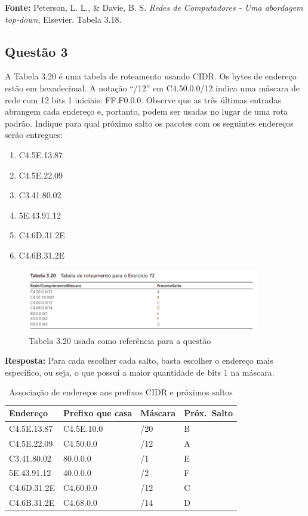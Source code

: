 \textbf{Fonte:} Peterson, L. L., \& Davie, B. S. \textit{Redes de Computadores - Uma abordagem top-down}, Elsevier. Tabela 3.18.

\subsection{Questão 3}
A Tabela 3.20 é uma tabela de roteamento usando CIDR. Os bytes de endereço estão em
hexadecimal. A notação “/12” em C4.50.0.0/12 indica uma máscara de rede com 12 bits 1 iniciais:
FF.F0.0.0. Observe que as três últimas entradas abrangem cada endereço e, portanto, podem ser usadas no lugar de uma rota padrão. 
Indique para qual próximo salto os pacotes com os seguintes endereços serão entregues:

\begin{enumerate}[label=\alph*.]
    \item C4.5E.13.87
    \item C4.5E.22.09
    \item C3.41.80.02
    \item 5E.43.91.12
    \item C4.6D.31.2E
    \item C4.6B.31.2E
\end{enumerate}

\begin{figure}[H]
    \centering
    \includegraphics[width=0.9\textwidth]{images/tabela_3_20.png}
    \caption{Tabela 3.20 usada como referência para a questão} 
    \label{fig:questao_3_tabela}
\end{figure}

\textbf{Resposta:}
Para cada escolher cada salto, basta escolher o endereço mais específico, ou seja, o que
possui a maior quantidade de bits 1 na máscara.\\

\begin{table}[ht]
\centering
\caption{Associação de endereços aos prefixos CIDR e próximos saltos}
\label{tab:roteamento}
\begin{tabular}{llll}
\toprule
\textbf{Endereço}      & \textbf{Prefixo que casa} & \textbf{Máscara} & \textbf{Próx.\ Salto} \\
\midrule
C4.5E.13.87 & C4.5E.10.0  & /20 & B \\
C4.5E.22.09 & C4.50.0.0   & /12 & A \\
C3.41.80.02 & 80.0.0.0    & /1  & E \\
5E.43.91.12 & 40.0.0.0    & /2  & F \\
C4.6D.31.2E & C4.60.0.0   & /12 & C \\
C4.6B.31.2E & C4.68.0.0   & /14 & D \\
\bottomrule
\end{tabular}
\end{table}
\FloatBarrier

